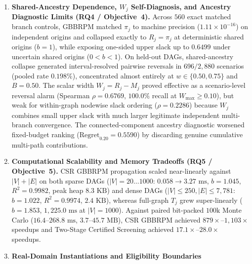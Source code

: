 \begin{enumerate}[label=\arabic*.,leftmargin=*]
Two-Stage Certified Screening increased deterministic top-$k$
resolution from $47.5\%$ (Stage~1) to $78.9\%$ (Stage~2) at $f=0.20$
($16.25\%$ full certification), delivering $2.00\times$ aggregate speedup
over full-graph $T_j$ and $18.6\times$ over $100\text{k}$ Monte Carlo.
Paired heterogeneous-weight experiments ($120$ evaluations) tightened
brackets further ($\Delta W = -0.00702$, $\Delta\mathrm{Regret} = -0.00112$,
$\Delta\mathrm{Res}_{S2} = +3.27\text{ pp}$), and $48$ independent
$1\text{M}$-trial audits verified $100.0\%$ agreement inside $100\text{k}$
Hoeffding intervals ($\max|\Delta\hat{\pi}| = 0.00475$, zero reversals).
\item \textbf{Shared-Ancestry Dependence, $W_j$ Self-Diagnosis, and
Ancestry Diagnostic Limits (RQ4 / Objective~4).} Across $560$ exact
matched branch controls, GBBRPM matched $\pi_j$ to machine precision
($1.11\times 10^{-16}$) on independent origins and collapsed exactly to
$R_j = \pi_j$ at deterministic shared origins ($b=1$), while exposing
one-sided upper slack up to $0.6499$ under uncertain shared origins
($0 < b < 1$). On held-out DAGs, shared-ancestry collapse generated
interval-resolved pairwise reversals in $696/2,880$ scenarios (pooled
rate $0.198\%$), concentrated almost entirely at $w \in \{0.50, 0.75\}$
and $B=0.50$. The scalar width $W_j = R_j - M_j$ proved effective as a
scenario-level reversal alarm (Spearman $\rho = 0.6769$, $100.0\%$
recall at $W_{\max} \ge 0.10$), but weak for within-graph nodewise
slack ordering ($\rho = 0.2286$) because $W_j$ combines small upper
slack with much larger legitimate independent multi-branch convergence.
The connected-component ancestry diagnostic worsened fixed-budget
ranking ($\mathrm{Regret}_{0.20}=0.5590$) by discarding genuine
cumulative multi-path contributions.
\item \textbf{Computational Scalability and Memory Tradeoffs (RQ5 /
Objective~5).} CSR GBBRPM propagation scaled near-linearly against
$|V|+|E|$ on both sparse DAGs ($|V|=20\dots 1000$: $0.058\to 3.27\text{ ms}$,
$b=1.045$, $R^2=0.9982$, peak heap $8.3\text{ KB}$) and dense DAGs
($|V|\le 250, |E|\le 7,781$: $b=1.022$, $R^2=0.9974$, $2.4\text{ KB}$),
whereas full-graph $T_j$ grew super-linearly ($b=1.853$,
$1,225.0\text{ ms}$ at $|V|=1000$). Against paired bit-packed
$100\text{k}$ Monte Carlo ($16.4$--$268.8\text{ ms}$,
$3.7$--$45.7\text{ MB}$), CSR GBBRPM achieved $879\times$--$1,103\times$
speedups and Two-Stage Certified Screening achieved
$17.1\times$--$28.0\times$ speedups.
\item \textbf{Real-Domain Instantiations and Eligibility Boundaries
}
\end{enumerate}
